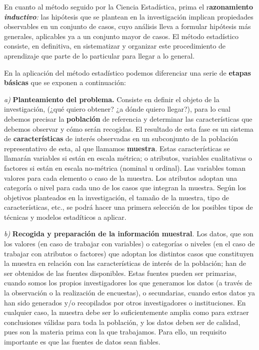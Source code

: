 \documentclass[
]{book}
\begin{document}
En cuanto al método seguido por la Ciencia Estadística, prima el r\textbf{azonamiento \emph{inductivo}}\emph{:} las hipótesis que se plantean en la investigación implican propiedades observables en un conjunto de casos, cuyo análisis lleva a formular hipótesis más generales, aplicables ya a un conjunto mayor de casos. El método estadístico consiste, en definitiva, en sistematizar y organizar este procedimiento de aprendizaje que parte de lo particular para llegar a lo general.

En la aplicación del método estadístico podemos diferenciar una serie de \textbf{etapas básicas} que se exponen a continuación:

\emph{a)} \textbf{Planteamiento del problema.} Consiste en definir el objeto de la investigación, (¿qué quiero obtener? ¿a dónde quiero llegar?), para lo cual debemos precisar la \textbf{población} de referencia y determinar las características que debemos observar y cómo serán recogidas. El resultado de esta fase es un sistema de \textbf{características} de interés observadas en un subconjunto de la población representativo de esta, al que llamamos \textbf{muestra}. Estas características se llamarán variables si están en escala métrica; o atributos, variables cualitativas o factores si están en escala no-métrica (nominal u ordinal). Las variables toman valores para cada elemento o caso de la muestra. Los atributos adoptan una categoría o nivel para cada uno de los casos que integran la muestra. Según los objetivos planteados en la investigación, el tamaño de la muestra, tipo de características, etc., se podrá hacer una primera selección de los posibles tipos de técnicas y modelos estadíticos a aplicar.

\emph{b)} \textbf{Recogida y preparación de la información muestral}. Los datos, que son los valores (en caso de trabajar con variables) o categorías o niveles (en el caso de trabajar con atributos o factores) que adoptan los distintos casos que constituyen la muestra en relación con las características de interés de la población; han de ser obtenidos de las fuentes disponibles. Estas fuentes pueden ser primarias, cuando somos los propios investigadores los que generamos los datos (a través de la observación o la realización de encuestas), o secundarias, cuando estos datos ya han sido generados y/o recopilados por otros investigadores o instituciones. En cualquier caso, la muestra debe ser lo suficientemente amplia como para extraer conclusiones válidas para toda la población, y los datos deben ser de calidad, pues son la materia prima con la que trabajamos. Para ello, un requisito importante es que las fuentes de datos sean fiables.
\end{document}
